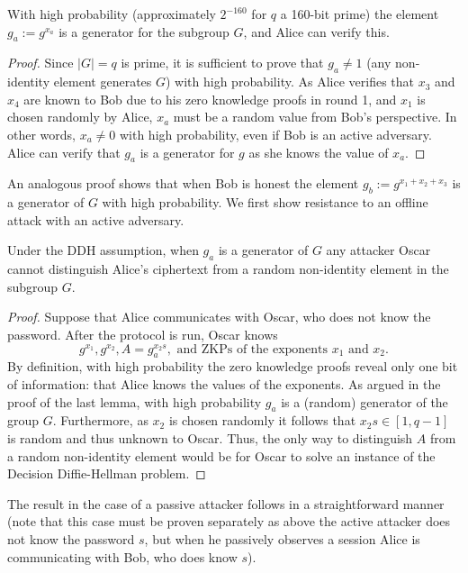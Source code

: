 \begin{lemma} With high probability (approximately $2^{-160}$ for $q$ a 160-bit prime) the element $g_a := g^{x_a}$ is a
generator for the subgroup $G$, and Alice can verify this.
\end{lemma}
\begin{proof}
Since $|G|=q$ is prime, it is sufficient to prove that $g_a \neq 1$ (any non-identity element generates $G$) with high probability.  
As Alice verifies that $x_3$ and $x_4$ are known to Bob due to his zero knowledge proofs in round 1, and $x_1$ is 
chosen randomly by Alice, $x_a$ must be a random value from Bob's perspective.  In other words, $x_a \neq 0$
with high probability, even if Bob is an active adversary.  Alice can verify that $g_a$ is a generator for $g$ as she knows the 
value of $x_a$.
\end{proof}

An analogous proof shows that when Bob is honest the element $g_b := g^{x_1+x_2+x_3}$ is a generator of $G$ with high probability.  We first show resistance to an offline attack with an active adversary.

\begin{theorem} Under the DDH assumption, when $g_a$ is a generator of $G$ any attacker Oscar cannot distinguish
Alice's ciphertext from a random non-identity element in the subgroup $G$.
\end{theorem}
\begin{proof}
Suppose that Alice communicates with Oscar, who does not know the password.  After the protocol is run, Oscar knows
\[ g^{x_1}, g^{x_2}, A = g_a^{x_2 s}, \text{ and ZKPs of the exponents } x_1 \text{ and } x_2. \]
By definition, with high probability the zero knowledge proofs reveal only one bit of information: that Alice knows the values of the
exponents.  As argued in the proof of the last lemma, with high probability $g_a$ is a (random) generator of the group $G$.  Furthermore, 
as $x_2$ is chosen randomly it follows that $x_2s \in [1,q-1]$ is random and thus unknown to Oscar.  Thus, the only way to distinguish $A$ from a random 
non-identity element would be for Oscar to solve an instance of the Decision Diffie-Hellman problem.
\end{proof}

The result in the case of a passive attacker follows in a straightforward manner (note that this case must be proven separately as above the active attacker does not know the password $s$, but when he passively observes a session Alice is communicating with Bob, who does know $s$).

